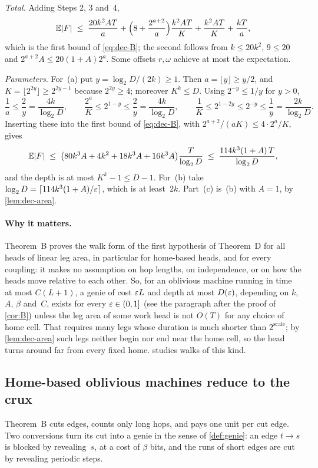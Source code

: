 \begin{informalproof}
\emph{Total.} Adding Steps 2, 3 and~4,
\[
  \mathbb E\lvert F \rvert\;\le\;\frac{20k^2AT}a+\Bigl(8+\frac{2^{a+2}}a\Bigr)\frac{k^2AT}K+\frac{k^2AT}K+\frac{kT}a,
\]
which is the first bound of \eqref{eq:dec-B}; the second follows from $k\le20k^2$, $9\le20$ and
$2^{a+2}A\le20(1+A)2^a$. Some offsets $r,\omega$ achieve at most the expectation.

\emph{Parameters.} For~(a) put $y=\log_2D/(2k)\ge1$. Then $a=\lfloor y\rfloor\ge y/2$, and $K=\lfloor2^{2y}\rfloor
\ge2^{2y-1}$ because $2^{2y}\ge4$; moreover $K^k\le D$. Using $2^{-y}\le1/y$ for $y>0$,
\[
  \frac1a\le\frac2y=\frac{4k}{\log_2D},\qquad\frac{2^a}K\le2^{1-y}\le\frac2y=\frac{4k}{\log_2D},\qquad
  \frac1K\le2^{1-2y}\le2^{-y}\le\frac1y=\frac{2k}{\log_2D}.
\]
Inserting these into the first bound of \eqref{eq:dec-B}, with $2^{a+2}/(aK)\le4\cdot2^a/K$, gives
\[
  \mathbb E\lvert F \rvert\;\le\;\bigl(80k^3A+4k^2+18k^3A+16k^3A\bigr)\frac T{\log_2D}\;\le\;\frac{114k^3(1+A)\,T}{\log_2D},
\]
and the depth is at most $K^k-1\le D-1$. For~(b) take $\log_2D=\lceil114k^3(1+A)/\varepsilon\rceil$, which is at least~$2k$.
Part~(c) is~(b) with $A=1$, by \cref{lem:dec-area}.
\end{informalproof}

\paragraph{Why it matters.} Theorem~B proves the walk form of the first hypothesis of Theorem~D for all heads of
linear leg area, in particular for home-based heads, and for every coupling: it makes no assumption on hop lengths, on
independence, or on how the heads move relative to each other. So, for an oblivious machine running in time at most
$C(L+1)$, a genie of cost $\varepsilon L$ and depth at most $D(\varepsilon)$, depending on $k$, $A$, $\beta$ and~$C$, exists for every
$\varepsilon\in(0,1]$ (see the paragraph after the proof of \cref{cor:B}) unless the leg area of some work head is not $O(T)$
for any choice of home cell. That requires many legs whose duration is much shorter than
$2^{\mathrm{scale}}$; by \cref{lem:dec-area} such legs neither begin nor end near the home cell, so the head turns
around far from every fixed home.  studies walks of this kind.

\subsection{Home-based oblivious machines reduce to the crux}\label{sec:dec-corB}

Theorem~B cuts edges, counts only long hops, and pays one unit per cut edge. Two conversions turn its cut into a genie
in the sense of \cref{def:genie}: an edge $t\to s$ is blocked by revealing~$s$, at a cost of $\beta$ bits, and the
runs of short edges are cut by revealing periodic steps.

